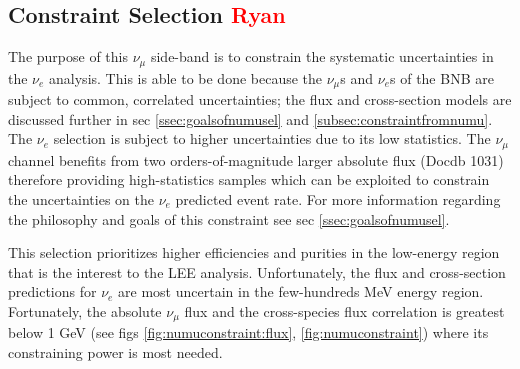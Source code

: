 \subsection{Constraint Selection \textcolor{red}{Ryan}}
\label{ssec:NuMUCCsel:constr}
\par The purpose of this $\nu_{\mu}$ side-band is to constrain the systematic uncertainties in the $\nu_{e}$ analysis. This is able to be done because the $\nu_{\mu}$s and $\nu_{e}$s of the BNB are subject to common, correlated uncertainties; the flux and cross-section models are discussed further in sec \ref{ssec:goalsofnumusel} and \ref{subsec:constraintfromnumu}. The $\nu_{e}$ selection is subject to higher uncertainties due to its low statistics. The $\nu_{\mu}$ channel benefits from two orders-of-magnitude larger absolute flux (Docdb 1031) therefore providing high-statistics samples which can be exploited to constrain the uncertainties on the $\nu_{e}$ predicted event rate. For more information regarding the philosophy and goals of this constraint see sec \ref{ssec:goalsofnumusel}.

\par This selection prioritizes higher efficiencies and purities in the low-energy region that is the interest to the LEE analysis. Unfortunately, the flux and cross-section predictions for $\nu_{e}$ are most uncertain in the few-hundreds MeV energy region. Fortunately, the absolute $\nu_{\mu}$ flux and the cross-species flux correlation is greatest below 1 GeV (see figs \ref{fig:numuconstraint:flux}, \ref{fig:numuconstraint}) where its constraining power is most needed.

